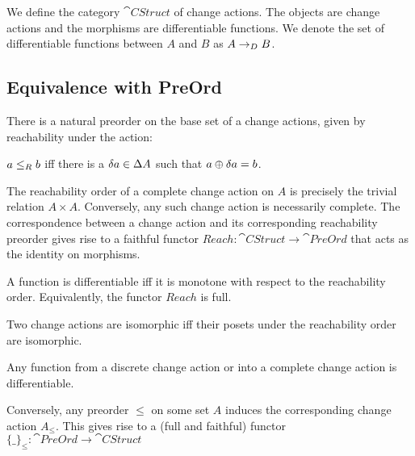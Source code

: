 \begin{defn}
  We define the category $\cat{CStruct}$ of change actions. The objects are
  change actions and the morphisms are differentiable functions. We denote
  the set of differentiable functions between $A$ and $B$ as $A \rightarrow_{D} B$.
\end{defn}

\subsection{Equivalence with PreOrd}

There is a natural preorder on the base set of a change actions, given by reachability
 under the action:
\begin{defn}
  $a \leq_R b$ iff there is a $\delta a \in \Delta A$ such that $a \oplus
  \delta a = b$.
\end{defn}

The reachability order of a complete change action on $A$ is precisely the trivial relation
$A \times A$. Conversely, any such change action is necessarily complete. The correspondence
between a change action and its corresponding reachability preorder gives rise to
a faithful functor $Reach : \cat{CStruct} \rightarrow \cat{PreOrd}$ that acts as the identity
on morphisms.

\begin{prop}
  A function is differentiable iff it is monotone with respect to the
  reachability order. Equivalently, the functor $Reach$ is full.
\end{prop}

\begin{corollary}
  Two change actions are isomorphic iff their posets under the reachability
  order are isomorphic.
\end{corollary}

\begin{corollary}
  Any function from a discrete change action or into a complete change
  action is differentiable.
\end{corollary}

Conversely, any preorder $\leq$ on some set $A$ induces the corresponding change action
$A_\leq$. This gives rise to a (full and faithful) functor $\{\_\}_\leq : \cat{PreOrd} \rightarrow \cat{CStruct}$

